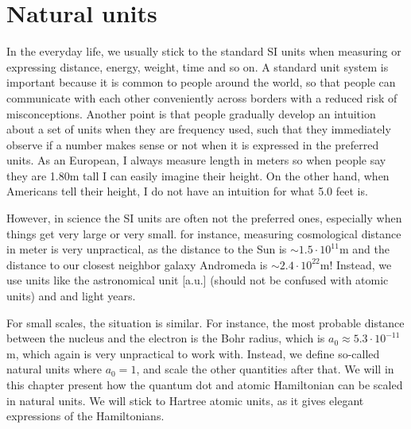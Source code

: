\chapter{Natural units} \label{app:units}
In the everyday life, we usually stick to the standard SI units when measuring or expressing distance, energy, weight, time and so on. A standard unit system is important because it is common to people around the world, so that people can communicate with each other conveniently across borders with a reduced risk of misconceptions. Another point is that people gradually develop an intuition about a set of units when they are frequency used, such that they immediately observe if a number makes sense or not when it is expressed in the preferred units. As an European, I always measure length in meters so when people say they are 1.80m tall I can easily imagine their height. On the other hand, when Americans tell their height, I do not have an intuition for what 5.0 feet is. 

However, in science the SI units are often not the preferred ones, especially when things get very large or very small. for instance, measuring cosmological distance in meter is very unpractical, as the distance to the Sun is $\sim1.5\cdot10^{11}$m and the distance to our closest neighbor galaxy Andromeda is $\sim 2.4\cdot10^{22}$m! Instead, we use units like the astronomical unit [a.u.] (should not be confused with atomic units) and and light years. 

For small scales, the situation is similar. For instance, the most probable distance between the nucleus and the electron is the Bohr radius, which is $a_0\approx5.3\cdot10^{-11}$m, which again is very unpractical to work with. Instead, we define so-called natural units where $a_0=1$, and scale the other quantities after that. We will in this chapter present how the quantum dot and atomic Hamiltonian can be scaled in natural units. We will stick to Hartree atomic units, as it gives elegant expressions of the Hamiltonians.  


